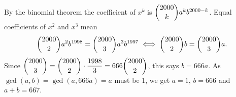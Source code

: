 By the binomial theorem the coefficient of $x^k$ is $\dbinom{2000}{k}a^kb^{2000-k}$. Equal coefficients of $x^2$ and $x^3$ mean
\[
\dbinom{2000}{2}a^2b^{1998}=\dbinom{2000}{3}a^3b^{1997}\iff\dbinom{2000}{2}b=\dbinom{2000}{3}a .
\]
Since $\dbinom{2000}{3}=\dbinom{2000}{2}\cdot\dfrac{1998}{3}=666\dbinom{2000}{2}$, this says $b=666a$. As $\gcd(a,b)=\gcd(a,666a)=a$ must be $1$, we get $a=1$, $b=666$ and $a+b=\boxed{667}$.
